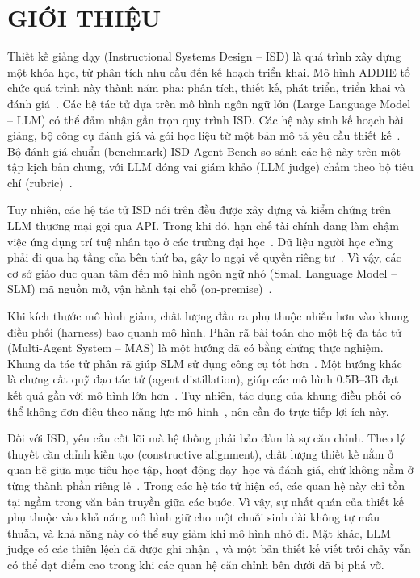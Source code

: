 \documentclass[conference,a4paper]{IEEEtran}
\begin{document}
\section{GIỚI THIỆU}
\label{sec:intro}

Thiết kế giảng dạy (Instructional Systems Design -- ISD) là quá trình xây dựng
một khóa học, từ phân tích nhu cầu đến kế hoạch triển khai. Mô hình ADDIE tổ
chức quá trình này thành năm pha: phân tích, thiết kế, phát triển, triển khai
và đánh giá~\cite{branch2009addie}. Các hệ tác tử dựa trên mô hình ngôn ngữ lớn
(Large Language Model -- LLM) có thể đảm nhận gần trọn quy trình ISD. Các hệ này sinh kế hoạch bài giảng, bộ công cụ đánh giá và
gói học liệu từ một bản mô tả yêu cầu thiết kế~\cite{zeng2026coma,zhang2025eduplanner,yao2025instructionalagents}.
Bộ đánh giá chuẩn (benchmark) ISD-Agent-Bench so sánh các hệ này trên một tập kịch
bản chung, với LLM đóng vai giám khảo (LLM judge) chấm theo bộ tiêu chí (rubric)~\cite{isdagentbench}.

Tuy nhiên, các hệ tác tử ISD nói trên đều được xây dựng và kiểm chứng trên LLM
thương mại gọi qua API. Trong khi đó, hạn chế tài chính đang làm chậm việc ứng dụng trí tuệ nhân tạo ở
các trường đại học~\cite{robert2025educause}. Dữ liệu người học cũng phải đi qua
hạ tầng của bên thứ ba, gây lo ngại về quyền riêng tư~\cite{yan2024ethical}. Vì vậy, các cơ sở giáo dục quan tâm đến mô hình ngôn
ngữ nhỏ (Small Language Model -- SLM) mã nguồn mở, vận hành tại chỗ
(on-premise)~\cite{chan2026bigger,katharakis2025slm}.

Khi kích thước mô hình giảm, chất lượng đầu ra phụ thuộc nhiều hơn vào khung điều phối (harness)
bao quanh mô hình. Phân rã bài toán cho một hệ đa tác tử (Multi-Agent System --
MAS) là một hướng đã có bằng chứng thực nghiệm. Khung đa tác tử phân rã giúp SLM
sử dụng công cụ tốt hơn~\cite{shen2024multillmagent}. Một hướng khác là chưng cất quỹ đạo tác tử (agent distillation), giúp các mô hình 0.5B--3B đạt kết quả gần với mô hình lớn hơn~\cite{kang2025agentdistill}.
Tuy nhiên, tác dụng của khung điều phối có thể không đơn điệu theo năng lực mô hình~\cite{cho2026harness}, nên cần đo trực tiếp lợi ích này.

Đối với ISD, yêu cầu cốt lõi mà hệ thống phải bảo đảm là sự căn chỉnh. Theo lý
thuyết căn chỉnh kiến tạo (constructive alignment), chất lượng thiết kế nằm ở
quan hệ giữa mục tiêu học tập, hoạt động dạy--học và đánh giá, chứ không nằm ở
từng thành phần riêng lẻ~\cite{biggs1996enhancing}. Trong các hệ tác tử hiện có,
các quan hệ này chỉ tồn tại ngầm trong văn bản truyền giữa các bước. Vì vậy, sự
nhất quán của thiết kế phụ thuộc vào khả năng mô hình giữ cho một chuỗi sinh dài
không tự mâu thuẫn, và khả năng này có thể suy giảm khi mô hình nhỏ đi. Mặt khác, LLM judge có các thiên lệch đã được ghi
nhận~\cite{ye2025justice}, và một bản thiết kế viết trôi chảy vẫn có thể đạt điểm
cao trong khi các quan hệ căn chỉnh bên dưới đã bị phá vỡ.
\end{document}
